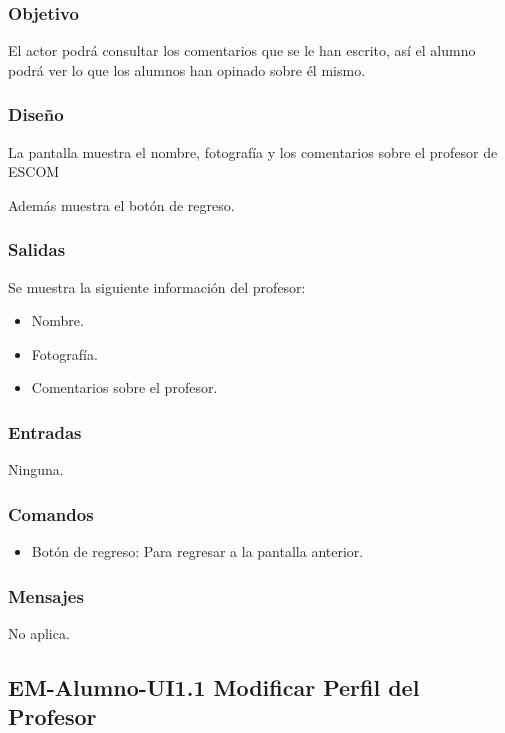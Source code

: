 \subsubsection{Objetivo}
	\noindent
	El actor podrá consultar los comentarios que se le han escrito, así el alumno podrá ver lo que los alumnos han opinado sobre él mismo.
\subsubsection{Diseño}
	\noindent
	La pantalla muestra el nombre, fotografía y los comentarios sobre el profesor de ESCOM
	
	Además muestra el botón de regreso.



\subsubsection{Salidas}
	Se muestra la siguiente información del profesor:
	\begin{itemize} 
		\item Nombre.
		\item Fotografía.
		\item Comentarios sobre el profesor.
	\end{itemize}

\subsubsection{Entradas}
	\noindent
	Ninguna.

\subsubsection{Comandos}
\begin{itemize}
	\item Botón de regreso: Para regresar a la pantalla anterior.
	
\end{itemize}

\subsubsection{Mensajes}
	\noindent
	No aplica.
\subsection{EM-Alumno-UI1.1 Modificar Perfil del Profesor}

